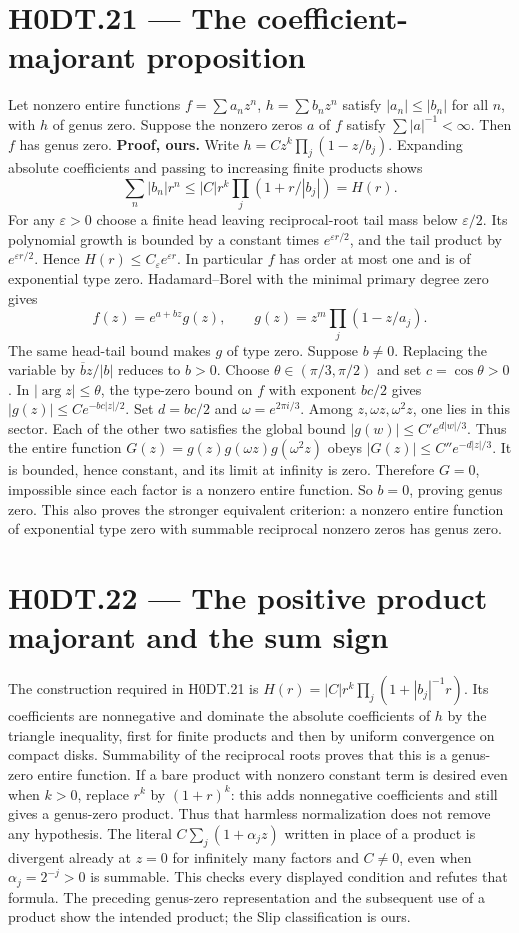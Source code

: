 \section*{H0DT.21 --- The coefficient-majorant proposition}
Let nonzero entire functions $f=\sum a_nz^n$, $h=\sum b_nz^n$ satisfy $|a_n|\le|b_n|$ for all $n$, with $h$ of genus zero. Suppose the nonzero zeros $a$ of $f$ satisfy $\sum |a|^{-1}<\infty$. Then $f$ has genus zero.
\textbf{Proof, ours.} Write $h=Cz^k\prod_j(1-z/b_j)$. Expanding absolute coefficients and passing to increasing finite products shows
\[
 \sum_n|b_n|r^n\le |C|r^k\prod_j(1+r/|b_j|)=H(r).
\]
For any $\varepsilon>0$ choose a finite head leaving reciprocal-root tail mass below $\varepsilon/2$. Its polynomial growth is bounded by a constant times $e^{\varepsilon r/2}$, and the tail product by $e^{\varepsilon r/2}$. Hence $H(r)\le C_\varepsilon e^{\varepsilon r}$. In particular $f$ has order at most one and is of exponential type zero. Hadamard--Borel with the minimal primary degree zero gives
\[
 f(z)=e^{a+bz}g(z),\qquad g(z)=z^m\prod_j(1-z/a_j).
\]
The same head-tail bound makes $g$ of type zero. Suppose $b\ne0$. Replacing the variable by $\overline b z/|b|$ reduces to $b>0$. Choose $\theta\in(\pi/3,\pi/2)$ and set $c=\cos\theta>0$. In $|\arg z|\le\theta$, the type-zero bound on $f$ with exponent $bc/2$ gives $|g(z)|\le C e^{-bc|z|/2}$. Set $d=bc/2$ and $\omega=e^{2\pi i/3}$. Among $z,\omega z,\omega^2z$, one lies in this sector. Each of the other two satisfies the global bound $|g(w)|\le C' e^{d|w|/3}$. Thus the entire function $G(z)=g(z)g(\omega z)g(\omega^2z)$ obeys $|G(z)|\le C''e^{-d|z|/3}$. It is bounded, hence constant, and its limit at infinity is zero. Therefore $G=0$, impossible since each factor is a nonzero entire function. So $b=0$, proving genus zero. This also proves the stronger equivalent criterion: a nonzero entire function of exponential type zero with summable reciprocal nonzero zeros has genus zero.

\section*{H0DT.22 --- The positive product majorant and the sum sign}
The construction required in H0DT.21 is $H(r)=|C|r^k\prod_j(1+|b_j|^{-1}r)$. Its coefficients are nonnegative and dominate the absolute coefficients of $h$ by the triangle inequality, first for finite products and then by uniform convergence on compact disks. Summability of the reciprocal roots proves that this is a genus-zero entire function. If a bare product with nonzero constant term is desired even when $k>0$, replace $r^k$ by $(1+r)^k$: this adds nonnegative coefficients and still gives a genus-zero product. Thus that harmless normalization does not remove any hypothesis. The literal $C\sum_j(1+\alpha_jz)$ written in place of a product is divergent already at $z=0$ for infinitely many factors and $C\ne0$, even when $\alpha_j=2^{-j}>0$ is summable. This checks every displayed condition and refutes that formula. The preceding genus-zero representation and the subsequent use of a product show the intended product; the Slip classification is ours.


